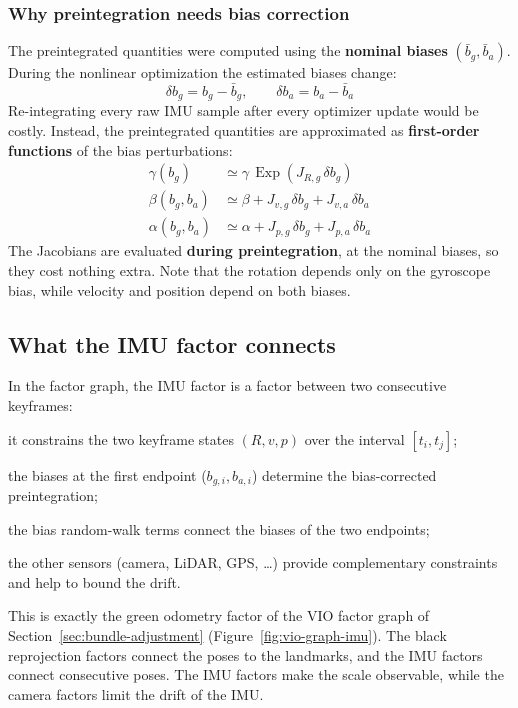 \subsubsection{Why preintegration needs bias correction}
The preintegrated quantities were computed using the \textbf{nominal biases} $(\bar b_g, \bar b_a)$. During the nonlinear optimization the estimated biases change:
\[
\delta b_g = b_g - \bar b_g, \qquad \delta b_a = b_a - \bar b_a
\]
Re-integrating every raw IMU sample after every optimizer update would be costly. Instead, the preintegrated quantities are approximated as \textbf{first-order functions} of the bias perturbations:
\[
\begin{aligned}
\gamma(b_g) &\simeq \gamma\, \operatorname{Exp}\!\left(J_{R,g}\, \delta b_g\right)\\
\beta(b_g, b_a) &\simeq \beta + J_{v,g}\, \delta b_g + J_{v,a}\, \delta b_a\\
\alpha(b_g, b_a) &\simeq \alpha + J_{p,g}\, \delta b_g + J_{p,a}\, \delta b_a
\end{aligned}
\]
The Jacobians are evaluated \textbf{during preintegration}, at the nominal biases, so they cost nothing extra. Note that the rotation depends only on the gyroscope bias, while velocity and position depend on both biases.

\subsection{What the IMU factor connects}
In the factor graph, the IMU factor is a factor between two consecutive keyframes:
\begin{compactitemize}
    \item it constrains the two keyframe states $(R, v, p)$ over the interval $[t_i, t_j]$;
    \item the biases at the first endpoint ($b_{g,i}, b_{a,i}$) determine the bias-corrected preintegration;
    \item the bias random-walk terms connect the biases of the two endpoints;
    \item the other sensors (camera, LiDAR, GPS, \dots) provide complementary constraints and help to bound the drift.
\end{compactitemize}
This is exactly the green odometry factor of the VIO factor graph of Section~\ref{sec:bundle-adjustment} (Figure~\ref{fig:vio-graph-imu}). The black reprojection factors connect the poses to the landmarks, and the IMU factors connect consecutive poses. The IMU factors make the scale observable, while the camera factors limit the drift of the IMU.



